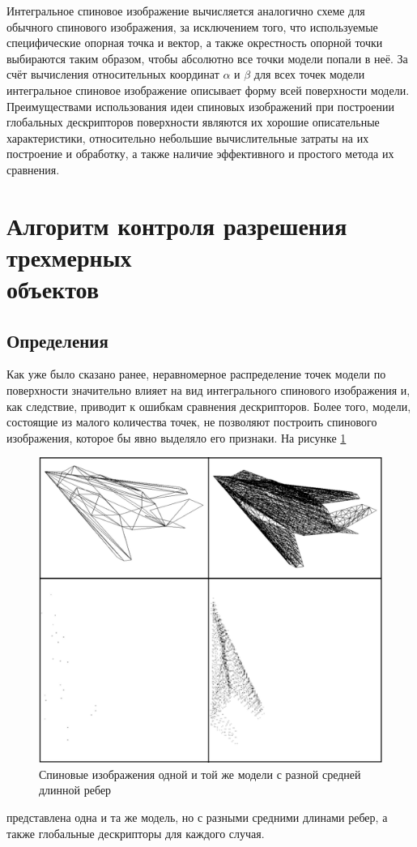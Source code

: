\documentclass[14pt]{article}
\numberwithin{figure}{section}
\numberwithin{equation}{section}
\begin{document}
Интегральное спиновое изображение вычисляется аналогично схеме для обычного спинового изображения, за исключением того, что используемые специфические опорная точка и вектор, а также окрестность опорной точки выбираются таким образом, чтобы абсолютно все точки модели попали в неё. За счёт вычисления относительных координат $\alpha$ и $\beta$ для всех точек модели интегральное спиновое изображение описывает форму всей поверхности модели. Преимуществами использования идеи спиновых изображений при построении глобальных дескрипторов поверхности являются их хорошие описательные характеристики, относительно небольшие вычислительные затраты на их построение и обработку, а также наличие эффективного и простого метода их сравнения.
\newpage

\section{Алгоритм контроля разрешения трехмерных \\ объектов}\label{sect2}

\subsection{Определения}

Как уже было сказано ранее, неравномерное распределение точек модели по поверхности значительно влияет на вид интегрального спинового изображения и, как следствие, приводит к ошибкам сравнения дескрипторов. Более того, модели, состоящие из малого количества точек, не позволяют построить спинового изображения, которое бы явно выделяло его признаки. На рисунке \ref{ris:5}
\begin{figure}[h]
	\begin{center}
		\includegraphics[scale=0.3]{5.JPG}
		\caption{Спиновые изображения одной и той же модели с разной средней длинной ребер}
		\label{ris:5}
	\end{center}
\end{figure}
 представлена одна и та же модель, но с разными средними длинами ребер, а также глобальные дескрипторы для каждого случая.
\end{document}

